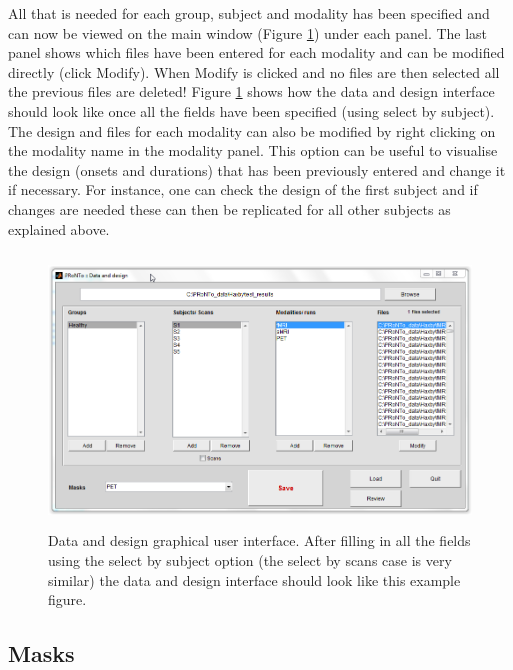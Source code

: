All that is needed for each group, subject and modality has been specified and can now be viewed on the main window (Figure \ref{Fig2.7}) under each panel. The last panel shows which files have been entered for each modality and can be modified directly (click Modify). When Modify is clicked and no files are then selected all the previous files are deleted! Figure \ref{Fig2.7} shows how the data and design interface should look like once all the fields have been specified (using select by subject).
The design and files for each modality can also be modified by right clicking on the modality name in the modality panel. This option can be useful to visualise the design (onsets and durations) that has been previously entered and change it if necessary. For instance, one can check the design of the first subject and if changes are needed these can then be replicated for all other subjects as explained above.

\begin{figure}[!h]
  \begin{center}
      \includegraphics[height=2.85in]{images/Figure7.png}
   \caption{Data and design graphical user interface. After filling in all the fields using the select by subject option (the select by scans case is very similar) the data and design interface should look like this example figure.}
    \label{Fig2.7}
  \end{center}
\end{figure}


\subsection{Masks}

